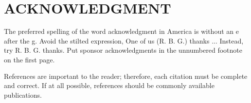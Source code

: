 \section*{ACKNOWLEDGMENT}

The preferred spelling of the word acknowledgment in America is without an e after the g. Avoid the stilted expression, One of us (R. B. G.) thanks ...  Instead, try R. B. G. thanks. Put sponsor acknowledgments in the unnumbered footnote on the first page.

References are important to the reader; therefore, each citation must be complete and correct. If at all possible, references should be commonly available publications.

